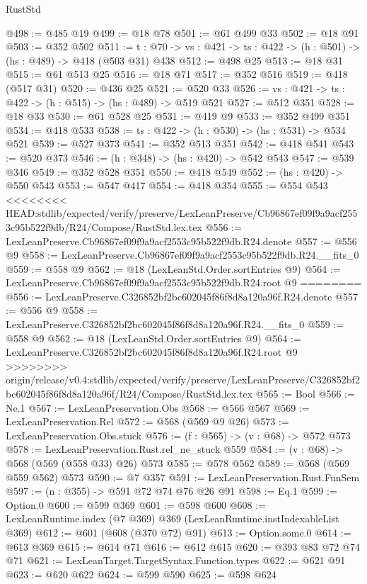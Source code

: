 \begin{lexlean}{RustStd}
\begin{coremodule}
{\begin{coremodule}
@498 := @485 @19
@499 := @18 @78
@501 := @61 @499 @33
@502 := @18 @91
@503 := @352 @502
@511 := {t : @70} -> {vs : @421} -> {ts : @422} -> (h : @501) -> (hs : @489) -> @418 (@503 @31) @438
@512 := @498 @25
@513 := @18 @31
@515 := @61 @513 @25
@516 := @18 @71
@517 := @352 @516
@519 := @418 (@517 @31)
@520 := @436 @25
@521 := @520 @33
@526 := {vs : @421} -> {ts : @422} -> (h : @515) -> (hs : @489) -> @519 @521
@527 := @512 @351
@528 := @18 @33
@530 := @61 @528 @25
@531 := @419 @9
@533 := @352 @499 @351
@534 := @418 @533
@538 := {ts : @422} -> (h : @530) -> (hs : @531) -> @534 @521
@539 := @527 @373
@541 := @352 @513 @351
@542 := @418 @541
@543 := @520 @373
@546 := (h : @348) -> (hs : @420) -> @542 @543
@547 := @539 @346
@549 := @352 @528 @351
@550 := @418 @549
@552 := (hs : @420) -> @550 @543
@553 := @547 @417
@554 := @418 @354
@555 := @554 @543
<<<<<<<< HEAD:stdlib/expected/verify/preserve/LexLeanPreserve/Cb96867ef09f9a9acf2553c95b522f9db/R24/Compose/RustStd.lex.tex
@556 := LexLeanPreserve.Cb96867ef09f9a9acf2553c95b522f9db.R24.denote
@557 := @556 @9
@558 := LexLeanPreserve.Cb96867ef09f9a9acf2553c95b522f9db.R24.__fits_0
@559 := @558 @9
@562 := @18 (LexLeanStd.Order.sortEntries @9)
@564 := LexLeanPreserve.Cb96867ef09f9a9acf2553c95b522f9db.R24.root @9
========
@556 := LexLeanPreserve.C326852bf2bc602045f86f8d8a120a96f.R24.denote
@557 := @556 @9
@558 := LexLeanPreserve.C326852bf2bc602045f86f8d8a120a96f.R24.__fits_0
@559 := @558 @9
@562 := @18 (LexLeanStd.Order.sortEntries @9)
@564 := LexLeanPreserve.C326852bf2bc602045f86f8d8a120a96f.R24.root @9
>>>>>>>> origin/release/v0.4:stdlib/expected/verify/preserve/LexLeanPreserve/C326852bf2bc602045f86f8d8a120a96f/R24/Compose/RustStd.lex.tex
@565 := Bool
@566 := Ne.{1}
@567 := LexLeanPreservation.Obs
@568 := @566 @567
@569 := LexLeanPreservation.Rel
@572 := @568 (@569 @9 @26)
@573 := LexLeanPreservation.Obs.stuck
@576 := (f : @565) -> (v : @68) -> @572 @573
@578 := LexLeanPreservation.Rust.rel_ne_stuck @559
@584 := (v : @68) -> @568 (@569 (@558 @33) @26) @573
@585 := @578 @562
@589 := @568 (@569 @559 @562) @573
@590 := @7 @357
@591 := LexLeanPreservation.Rust.FunSem
@597 := (n : @355) -> @591 @72 @74 @76 @26 @91
@598 := Eq.{1}
@599 := Option.{0}
@600 := @599 @369
@601 := @598 @600
@608 := LexLeanRuntime.index (@7 @369) @369 (LexLeanRuntime.instIndexableList @369)
@612 := @601 (@608 (@370 @72) @91)
@613 := Option.some.{0}
@614 := @613 @369
@615 := @614 @71
@616 := @612 @615
@620 := @393 @83 @72 @74 @71
@621 := LexLeanTarget.TargetSyntax.Function.types
@622 := @621 @91
@623 := @620 @622
@624 := @599 @590
@625 := @598 @624

\end{coremodule}}
\end{coremodule}
\end{lexlean}
